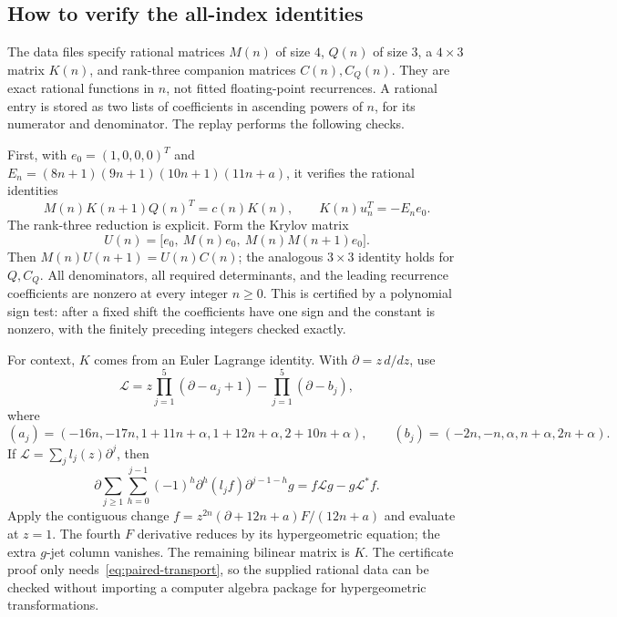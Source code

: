 \subsection{How to verify the all-index identities}\label{subsec:paired-proof}
The data files specify rational matrices $M(n)$ of size $4$, $Q(n)$
of size $3$, a $4\times3$ matrix $K(n)$, and rank-three companion
matrices $C(n),C_Q(n)$. They are exact rational functions in $n$,
not fitted floating-point recurrences. A rational entry is stored as
two lists of coefficients in ascending powers of $n$, for its numerator
and denominator. The replay performs the following checks.

First, with $e_0=(1,0,0,0)^T$ and
$E_n=(8n+1)(9n+1)(10n+1)(11n+a)$, it verifies the rational identities
\begin{equation}\label{eq:paired-transport}
 M(n)K(n+1)Q(n)^T=c(n)K(n),\qquad K(n)u_n^T=-E_ne_0.
\end{equation}
The rank-three reduction is explicit. Form the Krylov matrix
\[
 U(n)=\bigl[e_0,\ M(n)e_0,\ M(n)M(n+1)e_0\bigr].
\]
Then $M(n)U(n+1)=U(n)C(n)$; the analogous $3\times3$ identity
holds for $Q,C_Q$. All denominators, all required determinants, and
the leading recurrence coefficients are nonzero at every integer
$n\geq0$. This is certified by a polynomial sign test: after a
fixed shift the coefficients have one sign and the constant is nonzero,
with the finitely preceding integers checked exactly.

For context, $K$ comes from an Euler Lagrange identity. With
$\partial=z\,d/dz$, use
\[
 \mathcal L=z\prod_{j=1}^5(\partial-a_j+1)
                  -\prod_{j=1}^5(\partial-b_j),
\]
where
\[
 (a_j)=(-16n,-17n,1+11n+\alpha,1+12n+\alpha,2+10n+\alpha),\qquad
 (b_j)=(-2n,-n,\alpha,n+\alpha,2n+\alpha).
\]
If $\mathcal L=\sum_j l_j(z)\partial^j$, then
\[
 \partial\sum_{j\geq1}\sum_{h=0}^{j-1}
       (-1)^h\partial^h(l_jf)\partial^{j-1-h}g
       =f\mathcal Lg-g\mathcal L^*f.
\]
Apply the contiguous change
$f=z^{2n}(\partial+12n+a)F/(12n+a)$ and evaluate at $z=1$.
The fourth $F$ derivative reduces by its hypergeometric equation;
the extra $g$-jet column vanishes. The remaining bilinear matrix is
$K$. The certificate proof only needs~\eqref{eq:paired-transport},
so the supplied rational data can be checked without importing a
computer algebra package for hypergeometric transformations.

